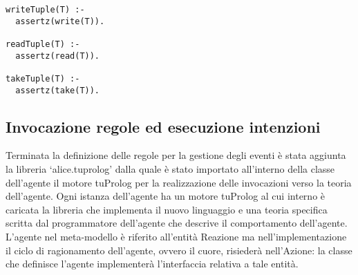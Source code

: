 \medskip
\begin{lstlisting}[firstnumber=1,label={lst:ImplementazioneRegoleSpatialTuples},caption={Implementazione regole estensione Spatial Tuples}]
writeTuple(T) :-
  assertz(write(T)).

readTuple(T) :-
  assertz(read(T)).

takeTuple(T) :-
  assertz(take(T)).
\end{lstlisting}

\subsection{Invocazione regole ed esecuzione intenzioni}\label{sctn:InvocazioneEsecuzioneIntenzioni}
Terminata la definizione delle regole per la gestione degli eventi è stata aggiunta la libreria `alice.tuprolog' dalla quale è stato importato all'interno della classe dell'agente il motore tuProlog per la realizzazione delle invocazioni verso la teoria dell'agente.
Ogni istanza dell'agente ha un motore tuProlog al cui interno è caricata la libreria che implementa il nuovo linguaggio e una teoria specifica scritta dal programmatore dell'agente che descrive il comportamento dell'agente.
L'agente nel meta-modello è riferito all'entità Reazione ma nell'implementazione il ciclo di ragionamento dell'agente, ovvero il cuore, risiederà nell'Azione: la classe che definisce l'agente implementerà l'interfaccia relativa a tale entità.

